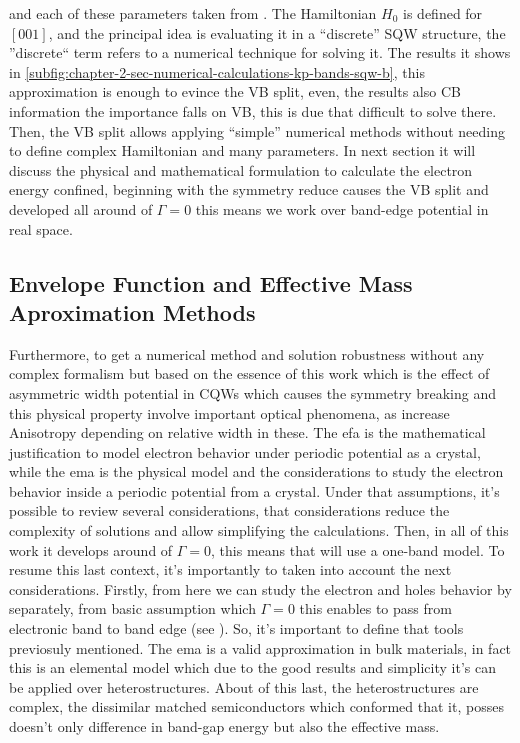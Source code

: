 and each of these parameters taken from \cite{vurgaftman2020bands}. The Hamiltonian $H_{0}$ is defined for $\left[001\right]$, and the principal idea is evaluating it in a ``discrete'' SQW structure, the ''discrete`` term refers to a numerical technique for solving it. The results it shows in \cref{subfig:chapter-2-sec-numerical-calculations-kp-bands-sqw-b}, this approximation is enough to evince the \gls{VB} split, even, the results also \gls{CB} information the importance falls on  \gls{VB}, this is due that difficult to solve there.  Then, the VB split allows applying ``simple'' numerical methods without needing to define complex Hamiltonian and many parameters. In next section it will discuss the physical and mathematical formulation to calculate the electron energy confined, beginning with the symmetry reduce causes the \gls{VB} split and developed all around of $\Gamma =0$ this means we work over band-edge potential in real space. 


\subsection{Envelope Function and Effective Mass Aproximation Methods}
\label{subsec:chapter-2-efa-and-ema}
\vspace{-10mm} 
Furthermore, to get a numerical method and solution robustness without any complex formalism but based on the essence of this work which is the effect of asymmetric width potential in CQWs which causes the symmetry breaking and this physical property involve important optical phenomena, as increase Anisotropy depending on relative width in these.
The \gls{efa} is the mathematical justification to model electron behavior under periodic potential as a crystal, while the \gls{ema} is the physical model and the considerations to study the electron behavior inside a periodic potential from a crystal\cite{harrison2016quantum}.
Under that assumptions, it's possible to review several considerations, that considerations reduce the complexity of solutions and allow simplifying the calculations. Then, in all of this work  it develops around of  $\Gamma=0$, this means that will use a one-band model. To resume this last context, it's importantly to taken into account the next considerations. Firstly, from here we can study the electron and holes behavior by separately, from basic assumption which $\Gamma=0$ this enables to pass from electronic band to band edge (see ). So, it's important to define that tools previosuly mentioned. The \gls{ema} is a valid approximation in bulk materials, in fact this is an elemental model which  due to the good results and simplicity it's can be applied over heterostructures.  About of this last, the heterostructures are complex, the dissimilar matched semiconductors which conformed that it, posses doesn't only difference in band-gap energy but also the effective mass.  


